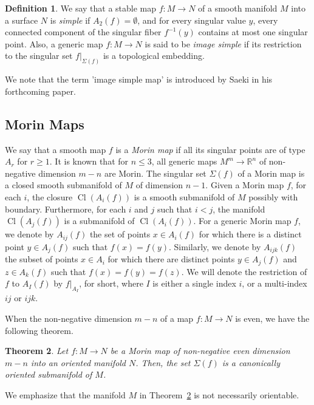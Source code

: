 \documentclass[12pt]{amsart}
\def \R{\mathbb{R}}
\def\co{\colon}
\newtheorem{theorem}{Theorem}[section]
\theoremstyle{definition}
\newtheorem{definition}[theorem]{Definition}
\begin{document}
\begin{definition} 
We say that a stable map $f:M \rightarrow N$ of a smooth manifold $M$ into a surface $N$ is \emph{simple} if $A_2(f) = \emptyset$,  and for every singular value $y$, every connected component of the singular fiber $f^{-1}(y)$ contains at most one singular point.  Also,  a generic map $f\co M\to N$ is said to be \emph{image simple} if its restriction to the singular set $f|_{\Sigma(f)}$ is a topological embedding.
\end{definition}

We note that the term 'image simple map' is introduced by Saeki in his forthcoming paper. 

\subsection{Morin Maps}
We say that a smooth map $f$ is a \emph{Morin map} if all its singular points are of type $A_r$ for $r\ge 1$. It is known that for $n\le 3$,  all generic maps $M^m\to \R^n$ of non-negative dimension $m-n$ are Morin. The singular set $\Sigma(f)$ of a Morin map is a closed smooth submanifold of $M$ of dimension $n-1$. Given a Morin map $f$, for each $i$, the closure $\mathop\mathrm{Cl}(A_i(f))$ is a smooth submanifold of $M$ possibly with boundary. Furthermore, for each $i$ and $j$ such that $i<j$, the manifold $\mathop\mathrm{Cl}(A_j(f))$ is a submanifold of $\mathop\mathrm{Cl}(A_i(f))$. For a generic Morin map $f$, we denote by $A_{ij}(f)$ the set of points $x\in A_i(f)$ for which there is a distinct point $y\in A_j(f)$ such that $f(x)=f(y)$. Similarly, we denote by $A_{ijk}(f)$ the subset of points $x\in A_i$ for which there are distinct points $y\in A_j(f)$ and $z\in A_k(f)$ such that $f(x)=f(y)=f(z)$.  We will denote the restriction of $f$ to $A_{I}(f)$ by $f|_{A_I}$,  for short, where $I$ is either a single index $i$, or a multi-index $ij$ or $ijk$. 

When the non-negative dimension $m-n$ of a map $f:M \rightarrow N$ is even, we have the following theorem. 

\begin{theorem}\label{th:5}  Let $f\co M \to N$ be a Morin map of non-negative even dimension $m-n$ into an oriented manifold $N$. Then,  the set $\Sigma(f)$ is a canonically oriented submanifold of $M$. 
\end{theorem}

We emphasize that the manifold $M$ in Theorem~\ref{th:5} is not necessarily orientable.
\end{document}
